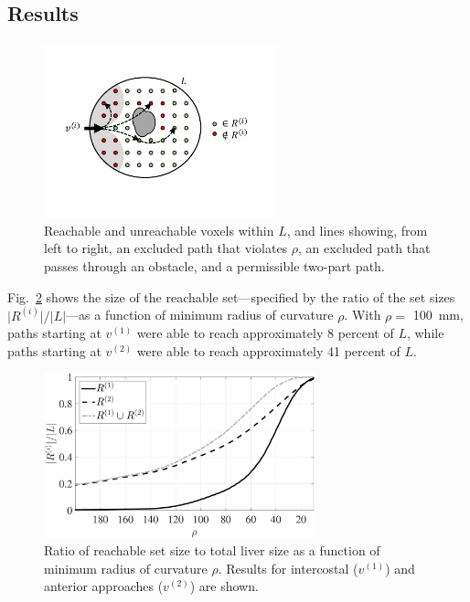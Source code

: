 \subsection{Results}
\begin{figure}[!t]
\centering
\includegraphics[width = 0.6\textwidth]{Images/Chapter3/Paths/Paths}%
\caption[Excluded and permissible paths]{Reachable and unreachable voxels within $L$, and lines showing, from left to right, an excluded path that violates $\rho$, an excluded path that passes through an obstacle, and a permissible two-part path.}
\label{fig:Paths}
\end{figure}

Fig.~\ref{fig:ReachableSizeByRho} shows the size of the reachable set---specified by the ratio of the set sizes $\lvert R^{(i)} \rvert / \lvert L \rvert$---as a function of minimum radius of curvature $\rho$. With $\rho =$ 100~mm, paths starting at $v^{(1)}$ were able to reach approximately 8 percent of $L$, while paths starting at $v^{(2)}$ were able to reach approximately 41 percent of $L$. 

\begin{figure}[!t]
\centering
\includegraphics[width = 0.7\textwidth]{Images/Chapter3/ReachableSizeByRho/ReachableSizeByRho}%
\caption[Impact of radius of curvature on reachable set size]{Ratio of reachable set size to total liver size as a function of minimum radius of curvature $\rho$. Results for intercostal ($v^{(1)}$) and anterior approaches ($v^{(2)}$) are shown.}
\label{fig:ReachableSizeByRho}
\end{figure}

